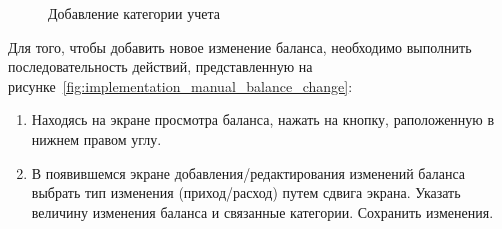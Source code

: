 \begin{figure}[h!]
  \centering
  \caption{Добавление категории учета}
  \label{fig:implementation_manual_category}
\end{figure}

Для того, чтобы добавить новое изменение баланса, необходимо выполнить
последовательность действий, представленную на
рисунке~\ref{fig:implementation_manual_balance_change}:
\begin{enumerate}
  \item Находясь на экране просмотра баланса, нажать на кнопку,
    раположенную в нижнем правом углу.
  \item В появившемся экране добавления/редактирования
    изменений баланса выбрать тип изменения (приход/расход) путем сдвига экрана.
    Указать величину изменения баланса и связанные категории.
    Сохранить изменения.
\end{enumerate}

